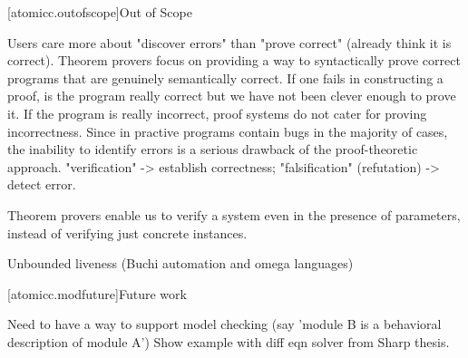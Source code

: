 [atomicc.outofscope]{Out of Scope}

Users care more about "discover errors" than "prove correct" (already think it is correct).
Theorem provers focus on providing a way to syntactically prove correct programs that are
genuinely semantically correct.  If one fails in constructing a proof, is the program really
correct but we have not been clever enough to prove it.  If the program is really 
incorrect, proof systems do not cater for proving incorrectness.
Since in practive programs contain bugs in the majority of cases, the inability
to identify errors is a serious drawback of the proof-theoretic approach.
"verification" -> establish correctness; "falsification" (refutation) -> detect error.

Theorem provers enable us to verify a system even in the presence of parameters, instead
of verifying just concrete instances.

Unbounded liveness (Buchi automation and omega languages)

[atomicc.modfuture]{Future work}

Need to have a way to support model checking (say 'module B is a behavioral description of module A')
Show example with diff eqn solver from Sharp thesis.
